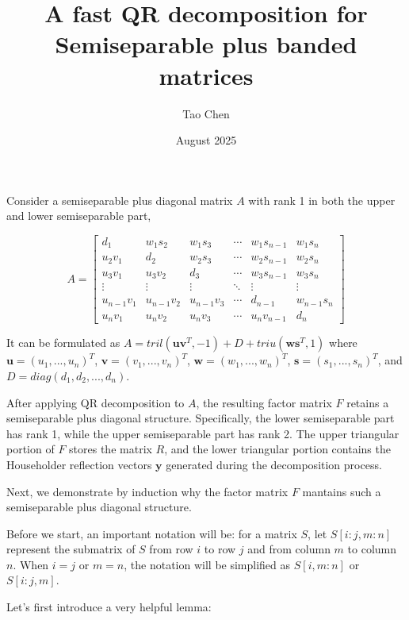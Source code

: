 \documentclass{article}
\title{A fast QR decomposition for Semiseparable plus banded matrices}
\author{Tao Chen}
\date{August 2025}
\begin{document}
\maketitle

Consider a semiseparable plus diagonal matrix $A$ with rank 1 in both the upper and lower semiseparable part,

\begin{equation}
A=
\begin{bmatrix}
d_1 & w_1s_2 & w_1s_3 & \cdots & w_1s_{n-1} & w_1s_n \\
u_2v_1 & d_2 & w_2s_3 & \cdots & w_2s_{n-1} & w_2s_n \\
u_3v_1 & u_3v_2 & d_3 & \cdots & w_3s_{n-1} & w_3s_n \\
\vdots & \vdots & \vdots & \ddots & \vdots & \vdots\\
u_{n-1}v_1 & u_{n-1}v_2 & u_{n-1}v_3 & \cdots & d_{n-1} & w_{n-1}s_n \\
u_nv_1 & u_nv_2 & u_nv_3 & \cdots & u_nv_{n-1} & d_n
\end{bmatrix}
\label{rank1matrix}
\end{equation}

It can be formulated as $A=tril(\mathbf{u}\mathbf{v}^T, -1) + D + triu(\mathbf{w}\mathbf{s}^T, 1)$ where $\mathbf{u}=(u_1,...,u_n)^T$, $\mathbf{v}=(v_1,...,v_n)^T$, $\mathbf{w}=(w_1,...,w_n)^T$, $\mathbf{s}=(s_1,...,s_n)^T$, and $D=diag(d_1, d_2, ..., d_n)$. 

After applying QR decomposition to $A$, the resulting factor matrix $F$ retains a semiseparable plus diagonal structure. Specifically, the lower semiseparable part has rank 1, while the upper semiseparable part has rank 2. The upper triangular portion of $F$ stores the matrix $R$, and the lower triangular portion contains the Householder reflection vectors $\mathbf{y}$ generated during the decomposition process.

Next, we demonstrate by induction why the factor matrix $F$ mantains such a semiseparable plus diagonal structure. 

Before we start, an important notation will be: for a matrix $S$, let $S[i:j,m:n]$ represent the submatrix of $S$ from row $i$ to row $j$ and from column $m$ to column $n$. When $i=j$ or $m=n$, the notation will be simplified as $S[i,m:n]$ or $S[i:j,m]$.

Let's first introduce a very helpful lemma:
\end{document}
